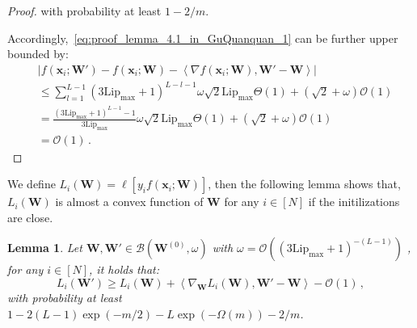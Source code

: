 \documentclass[nohyperref]{article}
\theoremstyle{plain}
\newtheorem{lemma}{Lemma}
\theoremstyle{definition}
\theoremstyle{remark}
\begin{document}
\begin{proof}
with probability at least $1-2/m$.
 
Accordingly,~\cref{eq:proof_lemma_4.1_in_GuQuanquan_1} can be further upper bounded by:
\begin{equation*}
\begin{split}
    & \left | f(\bm {x}_i;\bm{W}') - f(\bm {x}_i;\bm{W}) - \left \langle \nabla  f(\bm {x}_i;\bm{W}), \bm{W}' -\bm{W}  \right \rangle \right | \\
    & \leq \sum_{l=1}^{L-1}(3\mathrm{Lip}_{\max} + 1)^{L-l-1}\omega\sqrt{2}\mathrm{Lip}_{\max}\Theta(1)  +(\sqrt{2}+\omega)\mathcal{O}(1)\\
    &  = \frac{(3\mathrm{Lip}_{\max}+1)^{L-1}-1}{3\mathrm{Lip}_{\max}}\omega\sqrt{2}\mathrm{Lip}_{\max}\Theta(1)  +(\sqrt{2}+\omega)\mathcal{O}(1)\\
    &  = \mathcal{O}(1)\,.
\end{split}
\end{equation*}
\end{proof}

We define $L_i(\bm{W})  = \ell[ y_i f(\bm{x}_i;\bm{W}) ]$, then the following lemma shows that, $L_i(\bm{W})$ is almost a convex function of $\bm{W}$ for any $i \in [N]$ 
if the initilizations are close.
\begin{lemma}
\label{lemma:lemma_4.2_in_GuQuanquan}
Let $\bm{W}, \bm{W}' \in \mathcal{B} (\bm{W}^{(0)},\omega )$  with $\omega = \mathcal{O}((3\mathrm{Lip}_{\max}+1)^{-(L-1)})$ 
, for any $i\in [N]$, it holds that:
\begin{equation*}
L_i(\bm{W}') \geq L_i(\bm{W}) + \left \langle \nabla_{\bm{W}} L_i(\bm{W}), \bm{W}'-\bm{W} \right \rangle -\mathcal{O}(1)\,,
\end{equation*}
with probability at least $1-2(L-1)\exp(-m/2)-L\exp(-\Omega (m))-2/m$.
\end{lemma}
\end{document}
